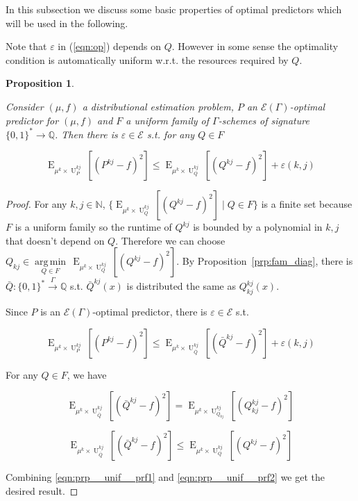 \documentclass{article}
\numberwithin{equation}{section}
\theoremstyle{definition}
\theoremstyle{plain}
\newtheorem{proposition}{Proposition}[section]
\newcommand{\Bool}{\{0,1\}}
\newcommand{\Words}{{\Bool^*}}
\DeclareMathOperator{\E}{E}
\DeclareMathOperator{\U}{U}
\newcommand{\Argmin}[1]{\underset{#1}{\operatorname{arg\,min}}\,}
\newcommand{\Nats}{\mathbb{N}}
\newcommand{\Rats}{\mathbb{Q}}
\newcommand{\Fall}{\mathcal{E}}
\newcommand{\Scheme}{\xrightarrow{\Gamma}}
\begin{document}
In this subsection we discuss some basic properties of optimal predictors which will be used in the following.

Note that $\varepsilon$ in (\ref{eqn:op}) depends on $Q$. However in some sense the optimality condition is automatically uniform w.r.t. the resources required by $Q$.

\begin{proposition}
\label{prp:unif}

Consider $(\mu,f)$ a distributional estimation problem, $P$ an $\Fall(\Gamma)$-optimal predictor for $(\mu,f)$ and $F$ a uniform family of $\Gamma$-schemes of signature $\Words \rightarrow \Rats$. Then there is $\varepsilon \in \Fall$ s.t. for any $Q \in F$

\begin{equation}
\E_{\mu^k \times \U_P^{kj}}[(P^{kj} - f)^2] \leq \E_{\mu^k \times \U_Q^{kj}}[(Q^{kj} - f)^2] + \varepsilon(k,j)
\end{equation}

\end{proposition}

\begin{proof}

For any $k,j \in \Nats$, $\{\E_{\mu^k \times \U_Q^{kj}}[(Q^{kj} - f)^2] \mid Q \in F\}$ is a finite set because $F$ is a uniform family so the runtime of $Q^{kj}$ is bounded by a polynomial in $k,j$ that doesn't depend on $Q$. Therefore we can choose ${Q_{kj} \in \Argmin{Q \in F} \E_{\mu^k \times \U_Q^{kj}}[(Q^{kj} - f)^2]}$. By Proposition~\ref{prp:fam_diag}, there is $\bar{Q}: \Words \Scheme \Rats$ s.t. $\bar{Q}^{kj}(x)$ is distributed the same as $Q_{kj}^{kj}(x)$.

Since $P$ is an $\Fall(\Gamma)$-optimal predictor, there is $\varepsilon \in \Fall$ s.t.

\begin{equation}
\label{eqn:prp__unif__prf1}
\E_{\mu^k \times \U_P^{kj}}[(P^{kj} - f)^2] \leq \E_{\mu^k \times \U_{\bar{Q}}^{kj}}[(\bar{Q}^{kj} - f)^2] + \varepsilon(k,j)
\end{equation}

For any $Q \in F$, we have 

$$\E_{\mu^k \times \U_{\bar{Q}}^{kj}}[(\bar{Q}^{kj} - f)^2]=\E_{\mu^k \times \U_{Q_{kj}}^{kj}}[(Q_{kj}^{kj} - f)^2]$$

\begin{equation}
\label{eqn:prp__unif__prf2}
\E_{\mu^k \times \U_{\bar{Q}}^{kj}}[(\bar{Q}^{kj} - f)^2] \leq \E_{\mu^k \times \U_Q^{kj}}[(Q^{kj} - f)^2]
\end{equation}

Combining \ref{eqn:prp__unif__prf1} and \ref{eqn:prp__unif__prf2} we get the desired result.

\end{proof}
\end{document}
